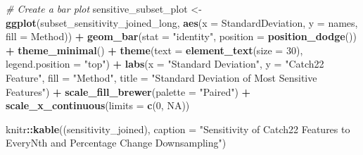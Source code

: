 \documentclass{article}
\newenvironment{Shaded}{\begin{snugshade}}{\end{snugshade}}
\newcommand{\AttributeTok}[1]{\textcolor[rgb]{0.13,0.29,0.53}{#1}}
\newcommand{\CommentTok}[1]{\textcolor[rgb]{0.56,0.35,0.01}{\textit{#1}}}
\newcommand{\ConstantTok}[1]{\textcolor[rgb]{0.56,0.35,0.01}{#1}}
\newcommand{\DecValTok}[1]{\textcolor[rgb]{0.00,0.00,0.81}{#1}}
\newcommand{\FunctionTok}[1]{\textcolor[rgb]{0.13,0.29,0.53}{\textbf{#1}}}
\newcommand{\NormalTok}[1]{#1}
\newcommand{\OtherTok}[1]{\textcolor[rgb]{0.56,0.35,0.01}{#1}}
\newcommand{\SpecialCharTok}[1]{\textcolor[rgb]{0.81,0.36,0.00}{\textbf{#1}}}
\newcommand{\StringTok}[1]{\textcolor[rgb]{0.31,0.60,0.02}{#1}}
\begin{document}
\begin{Shaded}
\begin{Highlighting}[]
\CommentTok{\# Create a bar plot}
\NormalTok{sensitive\_subset\_plot }\OtherTok{\textless{}{-}} \FunctionTok{ggplot}\NormalTok{(subset\_sensitivity\_joined\_long, }\FunctionTok{aes}\NormalTok{(}\AttributeTok{x =}\NormalTok{ StandardDeviation, }\AttributeTok{y =}\NormalTok{ names, }\AttributeTok{fill =}\NormalTok{ Method)) }\SpecialCharTok{+}
  \FunctionTok{geom\_bar}\NormalTok{(}\AttributeTok{stat =} \StringTok{"identity"}\NormalTok{, }\AttributeTok{position =} \FunctionTok{position\_dodge}\NormalTok{()) }\SpecialCharTok{+}
  \FunctionTok{theme\_minimal}\NormalTok{() }\SpecialCharTok{+}
  \FunctionTok{theme}\NormalTok{(}\AttributeTok{text =} \FunctionTok{element\_text}\NormalTok{(}\AttributeTok{size =} \DecValTok{30}\NormalTok{), }\AttributeTok{legend.position =} \StringTok{"top"}\NormalTok{) }\SpecialCharTok{+}
  \FunctionTok{labs}\NormalTok{(}\AttributeTok{x =} \StringTok{"Standard Deviation"}\NormalTok{, }\AttributeTok{y =} \StringTok{"Catch22 Feature"}\NormalTok{, }\AttributeTok{fill =} \StringTok{"Method"}\NormalTok{, }\AttributeTok{title =} \StringTok{"Standard Deviation of Most Sensitive Features"}\NormalTok{) }\SpecialCharTok{+}
  \FunctionTok{scale\_fill\_brewer}\NormalTok{(}\AttributeTok{palette =} \StringTok{"Paired"}\NormalTok{) }\SpecialCharTok{+}
  \FunctionTok{scale\_x\_continuous}\NormalTok{(}\AttributeTok{limits =} \FunctionTok{c}\NormalTok{(}\DecValTok{0}\NormalTok{, }\ConstantTok{NA}\NormalTok{))}
\end{Highlighting}
\end{Shaded}

\begin{Shaded}
\begin{Highlighting}[]
\NormalTok{knitr}\SpecialCharTok{::}\FunctionTok{kable}\NormalTok{((sensitivity\_joined), }\AttributeTok{caption =} \StringTok{"Sensitivity of Catch22 Features to EveryNth and Percentage Change Downsampling"}\NormalTok{)}
\end{Highlighting}
\end{Shaded}
\end{document}
